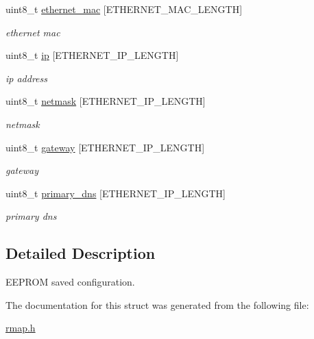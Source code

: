 \begin{DoxyCompactItemize}
uint8\+\_\+t \hyperlink{structconfiguration__t_a6ade77826c87e62532cae8ca0f045dac}{ethernet\+\_\+mac} \mbox{[}E\+T\+H\+E\+R\+N\+E\+T\+\_\+\+M\+A\+C\+\_\+\+L\+E\+N\+G\+TH\mbox{]}
\begin{DoxyCompactList}\small\item\em ethernet mac \end{DoxyCompactList}\item 
\mbox{\label{structconfiguration__t_a0b698acfbb52f889c906b9b175f7a5d5}} 
uint8\+\_\+t \hyperlink{structconfiguration__t_a0b698acfbb52f889c906b9b175f7a5d5}{ip} \mbox{[}E\+T\+H\+E\+R\+N\+E\+T\+\_\+\+I\+P\+\_\+\+L\+E\+N\+G\+TH\mbox{]}
\begin{DoxyCompactList}\small\item\em ip address \end{DoxyCompactList}\item 
\mbox{\label{structconfiguration__t_a60716ed8c6a82119a46eb6345b88ca32}} 
uint8\+\_\+t \hyperlink{structconfiguration__t_a60716ed8c6a82119a46eb6345b88ca32}{netmask} \mbox{[}E\+T\+H\+E\+R\+N\+E\+T\+\_\+\+I\+P\+\_\+\+L\+E\+N\+G\+TH\mbox{]}
\begin{DoxyCompactList}\small\item\em netmask \end{DoxyCompactList}\item 
\mbox{\label{structconfiguration__t_a9d18b7f4094f4d7a50d2245e0370adc0}} 
uint8\+\_\+t \hyperlink{structconfiguration__t_a9d18b7f4094f4d7a50d2245e0370adc0}{gateway} \mbox{[}E\+T\+H\+E\+R\+N\+E\+T\+\_\+\+I\+P\+\_\+\+L\+E\+N\+G\+TH\mbox{]}
\begin{DoxyCompactList}\small\item\em gateway \end{DoxyCompactList}\item 
\mbox{\label{structconfiguration__t_acd481c434576a90959c342e877985b32}} 
uint8\+\_\+t \hyperlink{structconfiguration__t_acd481c434576a90959c342e877985b32}{primary\+\_\+dns} \mbox{[}E\+T\+H\+E\+R\+N\+E\+T\+\_\+\+I\+P\+\_\+\+L\+E\+N\+G\+TH\mbox{]}
\begin{DoxyCompactList}\small\item\em primary dns \end{DoxyCompactList}\end{DoxyCompactItemize}


\subsection{Detailed Description}
E\+E\+P\+R\+OM saved configuration. 

The documentation for this struct was generated from the following file\+:\begin{DoxyCompactItemize}
\item 
\hyperlink{rmap_8h}{rmap.\+h}\end{DoxyCompactItemize}
